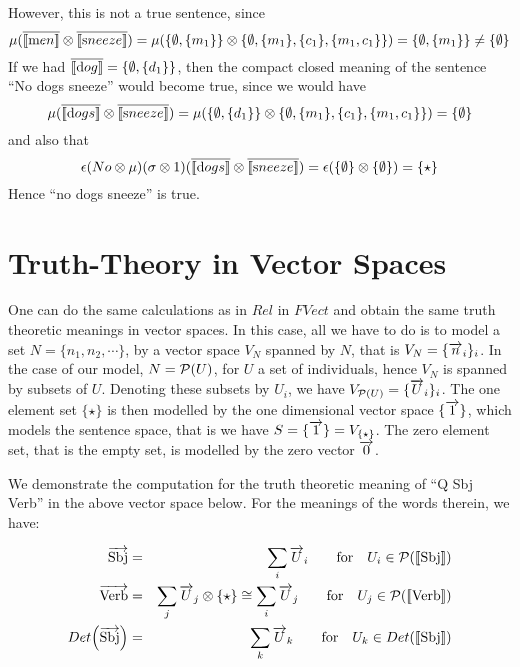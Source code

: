 \noindent
However, this is not a true sentence, since  
\[
\mu(\overline{[\![ \text men ]\!]} \otimes \overline{[\![ \text sneeze ]\!]}) = \mu(\{\emptyset, \{m_1\}\} \otimes \{\emptyset, \{m_1\}, \{c_1\}, \{m_1, c_1\}\}) = \{\emptyset, \{m_1\}\}   \neq \{\emptyset\}
\]
 If we had $\overline{[\![ \text dog ]\!]} = \{\emptyset, \{d_1\}\}$, then the compact closed meaning of the sentence ``No dogs sneeze''  would become true, since we would have
\[
\mu(\overline{[\![ \text dogs ]\!]} \otimes \overline{[\![ \text sneeze ]\!]}) = \mu(\{\emptyset, \{d_1\}\} \otimes \{\emptyset, \{m_1\}, \{c_1\}, \{m_1, c_1\}\}) = \{\emptyset\}
\]
and also that  
\[
\epsilon(No \otimes \mu)(\sigma \otimes 1) (\overline{[\![ \text dogs ]\!]} \otimes \overline{[\![ \text sneeze ]\!]})=  \epsilon(\{\emptyset\}  \otimes \{\emptyset\}) = \{\star\}
\]
Hence ``no dogs sneeze'' is true. 

\section{Truth-Theory in Vector Spaces} 

One can do the same calculations as in $Rel$ in $FVect$ and obtain the same truth theoretic meanings in vector spaces. In this case, all we have to do is to model a set $N = \{n_1, n_2, \cdots\}$, by a vector space $V_N$ spanned by $N$, that is $V_N = \{\overrightarrow{n}_i\}_i$. In the case of our model, $N = {\cal P}(U)$, for $U$ a set of individuals, hence $V_N$ is spanned by subsets of $U$.  Denoting these subsets by $U_i$, we have $V_{{\cal P}(U)} = \{\overrightarrow{U}_i\}_i$. The one element set $\{\star\}$ is then modelled  by the one dimensional vector space $\{\overrightarrow{1}\}$, which  models the sentence space, that is we have $S = \{\overrightarrow{1}\} = V_{\{\star\}}$.  The zero element set, that is the empty set, is modelled by the zero vector $\overrightarrow{0}$. 

We demonstrate the computation for the truth theoretic meaning of ``Q Sbj Verb'' in the above vector space below. For the meanings of the words therein, we have:

\begin{eqnarray*}
\overrightarrow{\text{Sbj}} &=& \sum_i \overrightarrow{U}_i \qquad \text{for} \quad U_i \in {\cal P}([\![ \text{Sbj} ]\!])\\
\overrightarrow{\text{Verb}} &=& \sum_j \overrightarrow{U}_j  \otimes \{\star\} \cong \sum_i \overrightarrow{U}_j  \qquad \text{for} \quad  U_j \in {\cal P}([\![ \text{Verb} ]\!])\\
Det\Big(\overrightarrow{\text{Sbj}}\Big) &=& \sum_k \overrightarrow{U}_k \qquad \text{for} \quad   U_k \in Det([\![ \text{Sbj} ]\!])
\end{eqnarray*}




